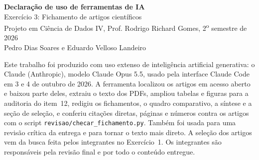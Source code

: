 \documentclass[12pt,a4paper]{article}
\begin{document}
\begin{center}
{\large\bfseries Declaração de uso de ferramentas de IA}\\[0.4em]
Exercício 3: Fichamento de artigos científicos\\
Projeto em Ciência de Dados IV, Prof. Rodrigo Richard Gomes, 2\textsuperscript{o} semestre de 2026\\
Pedro Dias Soares e Eduardo Velloso Landeiro
\end{center}

\bigskip
Este trabalho foi produzido com uso extenso de inteligência artificial generativa: o Claude
(Anthropic), modelo Claude Opus 5.5, usado pela interface Claude Code em 3 e 4 de outubro de 2026.
A ferramenta localizou os artigos em acesso aberto e baixou parte deles, extraiu o texto dos PDFs,
ampliou tabelas e figuras para a auditoria do item~12, redigiu os fichamentos, o quadro
comparativo, a síntese e a seção de seleção, e conferiu citações diretas, páginas e números contra
os artigos com o script \texttt{revisao/checar\_fichamento.py}. Também foi usada para uma revisão
crítica da entrega e para tornar o texto mais direto. A seleção dos artigos vem da busca feita
pelos integrantes no Exercício~1. Os integrantes são responsáveis pela revisão final e por todo o
conteúdo entregue.
\end{document}
